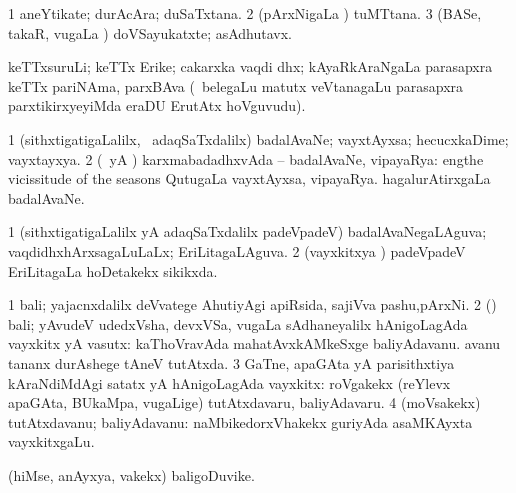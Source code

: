 {{{{{\bentry
{} 
\gl{\nA}
\expl{}
\bmng
\bnum
\num{1} aneYtikate; durAcAra; duSaTxtana. 
\num{2} (pArxNigaLa \vi) tuMTtana. 
\num{3} (BASe, takaR, \mo vugaLa \vi) doVSayukatxte; asAdhutavx. 
\enum
\emng
\eentry

\bentry
{}
\gl{\nA}
\expl{}
\bmng
 keTTxsuruLi; keTTx Erike; cakarxka vaqdi dhx; kAyaRkAraNgaLa parasapxra keTTx pariNAma, parxBAva (\kanmu\ belegaLu matutx veVtanagaLu parasapxra parxtikirxyeyiMda eraDU ErutAtx hoVguvudu). 
\emng
\eentry

\bentry
{} 
\gl{\nA}
\expl{}
\bmng
\bnum
\num{1} (sithxtigatigaLalilx, \kanmu\ adaqSaTxdalilx) badalAvaNe; vayxtAyxsa; hecucxkaDime; vayxtayxya. 
\num{2} (\pArxparx\ yA \kAparx) karxmabadadhxvAda -- badalAvaNe, vipayaRya: eng{the vicissitude of the seasons} QutugaLa vayxtAyxsa, vipayaRya.  hagalurAtirxgaLa badalAvaNe. 
\enum
\emng
\eentry

\bentry
{} 
\gl{\gu}
\expl{}
\bmng
\bnum
\num{1} (sithxtigatigaLalilx yA adaqSaTxdalilx padeVpadeV) badalAvaNegaLAguva; vaqdidhxhArxsagaLuLaLx; EriLitagaLAguva. 
\num{2} (vayxkitxya \vi) padeVpadeV EriLitagaLa hoDetakekx sikikxda. 
\enum
\emng
\eentry

\bentry
{} 
\gl{\nA}
\expl{}
\bmng
\bnum
\num{1} bali; yajacnxdalilx deVvatege AhutiyAgi apiRsida, sajiVva pashu,pArxNi. 
\num{2} (\rUpa) bali; yAvudeV udedxVsha, devxVSa, \mo vugaLa sAdhaneyalilx hAnigoLagAda vayxkitx yA vasutx:  kaThoVravAda mahatAvxkAMkeSxge baliyAdavanu.  avanu tananx durAshege tAneV tutAtxda. 
\num{3} GaTne, apaGAta yA parisithxtiya kAraNdiMdAgi satatx yA hAnigoLagAda vayxkitx:  roVgakekx (reYlevx apaGAta, BUkaMpa, \mo vugaLige) tutAtxdavaru, baliyAdavaru. 
\num{4} (moVsakekx) tutAtxdavanu; baliyAdavanu:  naMbikedorxVhakekx guriyAda asaMKAyxta vayxkitxgaLu. 
\enum
\emng
\eentry

\bentry
{} 
\gl{\sakirx}
\expl{}
\bmng
\emng
\eentry

\bentry
{} 
\gl{\nA}
\expl{}
\bmng
 (hiMse, anAyxya, \mo vakekx) baligoDuvike. 
\emng
\eentry

}}}}}
